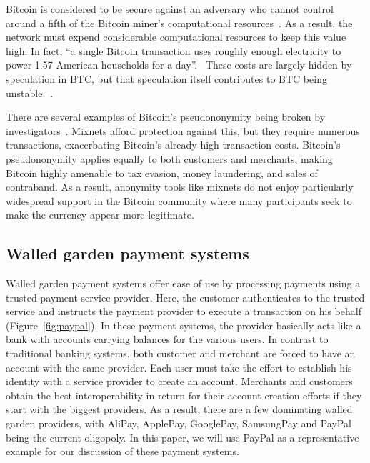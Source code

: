 \documentclass{IEEEtran}
\begin{document}
Bitcoin is considered to be secure against an adversary who cannot
control around a fifth of the Bitcoin miner's computational
resources~\cite{BTC:Bahack13,BTC:MajorityNotEnough,BTC:Eclipse}.  %
As a result, the network must expend considerable computational
resources to keep this value high.
In fact, ``a single Bitcoin transaction uses roughly enough
electricity to power 1.57 American households for a day''.~\cite{vice_btc_unsustainable}
These costs are largely hidden by speculation in BTC,
but that speculation itself contributes to BTC being
unstable.~\cite{lehmann_btc_fools_gold,jeffries_economists_v_btc,lewis_btc_is_junk}. %


There are several examples of Bitcoin's pseudononymity being broken
by investigators~\cite{BTC:Anonymity}.  Mixnets afford protection
against this, but they require numerous transactions, exacerbating
Bitcoin's already high transaction costs.
%
Bitcoin's pseudononymity applies equally to both customers and
merchants, making Bitcoin highly amen\-able to tax evasion, money
laundering, and sales of contraband.  As a result, anonymity tools
like mixnets do not enjoy particularly widespread support in the
Bitcoin community where many participants seek to make the currency
appear more legitimate.





\subsection{Walled garden payment systems}

Walled garden payment systems offer ease of use by processing payments
using a trusted payment service provider. Here, the customer
authenticates to the trusted service and instructs the payment
provider to execute a transaction on his behalf
(Figure~\ref{fig:paypal}).  In these payment systems, the provider
basically acts like a bank with accounts carrying balances for the
various users.  In contrast to traditional banking systems, both
customer and merchant are forced to have an account with the same
provider.  Each user must take the effort to establish his identity
with a service provider to create an account.  Merchants and customers
obtain the best interoperability in return for their account creation
efforts if they start with the biggest providers.  As a result, there
are a few dominating walled garden providers, with AliPay, ApplePay,
GooglePay, SamsungPay and PayPal being the current oligopoly.  In this
paper, we will use PayPal as a representative example for our discussion
of these payment systems.
\end{document}
